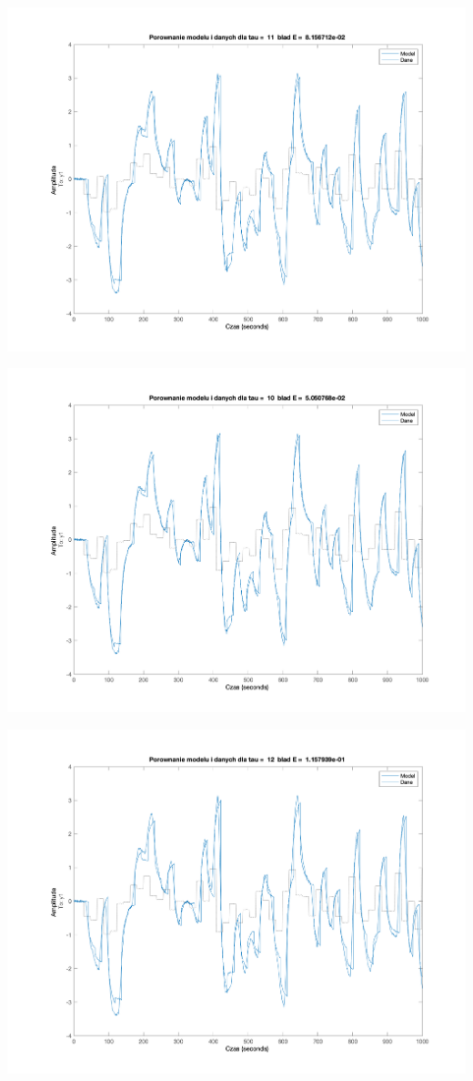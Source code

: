 \documentclass[a4paper, 11pt]{article}
\begin{document}
\begin{enumerate}
 \includegraphics[width=\linewidth]{./ModelsP1/modelTau11.png} 
 
 \includegraphics[width=\linewidth]{./ModelsP1/modelTau10.png} 
 
 \includegraphics[width=\linewidth]{./ModelsP1/modelTau12.png} 
 

\end{enumerate}
\end{document}

